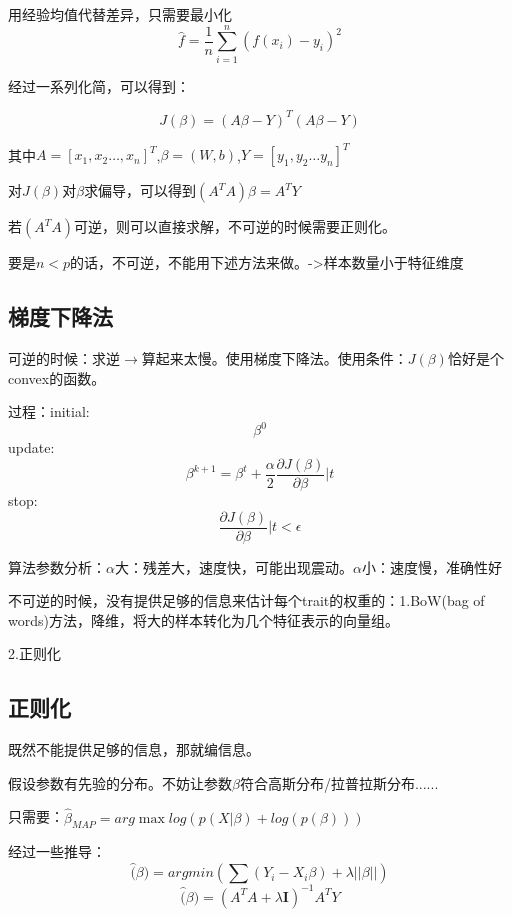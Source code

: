 \documentclass[UTF8]{ctexart}
\begin{document}
用经验均值代替差异，只需要最小化$$\hat{f}=\frac{1}{n}\sum_{i=1}^n(f(x_i)-y_i)^2$$

经过一系列化简，可以得到：

$$J(\beta)=(A\beta-Y)^T(A\beta-Y)$$

其中$A=[x_1,x_2\dots,x_n]^T$,$\beta=(W,b)$,$Y=[y_1,y_2\dots y_n]^T$

对$J(\beta)$对$\beta$求偏导，可以得到$(A^TA)\beta=A^TY$

若$(A^TA)$可逆，则可以直接求解，不可逆的时候需要正则化。

要是$n<p$的话，不可逆，不能用下述方法来做。->样本数量小于特征维度

\subsection{梯度下降法}
可逆的时候：求逆$\rightarrow$算起来太慢。使用梯度下降法。使用条件：$J(\beta)$恰好是个convex的函数。

过程：initial:$$\beta^0$$
update:$$\beta^{k+1}=\beta^t+\frac{\alpha}{2}\frac{\partial J(\beta)}{\partial \beta}|t$$
stop:$$\frac{\partial J(\beta)}{\partial \beta}|t < \epsilon$$

算法参数分析：$\alpha$大：残差大，速度快，可能出现震动。$\alpha$小：速度慢，准确性好

不可逆的时候，没有提供足够的信息来估计每个trait的权重的：1.BoW(bag of words)方法，降维，将大的样本转化为几个特征表示的向量组。

2.正则化
\subsection{正则化}
既然不能提供足够的信息，那就编信息。

假设参数有先验的分布。不妨让参数$\beta$符合高斯分布/拉普拉斯分布......

只需要：$\hat{\beta}_{MAP}=arg\max log(p(X|\beta) + log(p(\beta)))$

经过一些推导：$$\hat(\beta) = argmin(\sum (Y_i - X_i\beta)+\lambda ||\beta||)$$
$$\hat(\beta)=(A^TA+\lambda \mathbf{I})^{-1}A^TY$$
\end{document}
